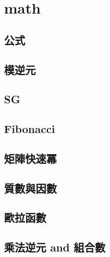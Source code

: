 %         

\section{math}
    \subsection{公式}
        
    \subsection{模逆元}
        
    \subsection{SG}
        
    \subsection{Fibonacci}
        
    \subsection{矩陣快速冪}
        
    \subsection{質數與因數}
          
    \subsection{歐拉函數}
        
    \subsection{乘法逆元 and 組合數}
        
        
